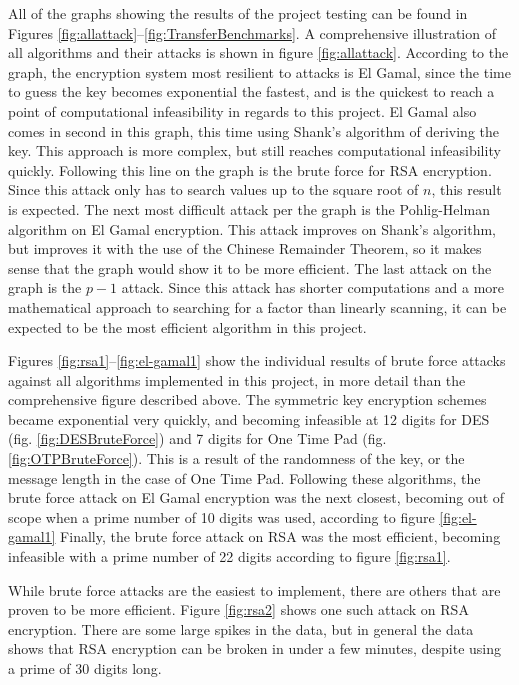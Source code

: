 \documentclass[12pt]{report}
\begin{document}
All of the graphs showing the results of the project testing can be found in Figures \ref{fig:allattack}--\ref{fig:TransferBenchmarks}. A comprehensive illustration of
all algorithms and their attacks is shown in figure \ref{fig:allattack}. According to the graph, the encryption system most resilient to attacks is El Gamal, since the
time to guess the key becomes exponential the fastest, and is the quickest to reach a point of computational infeasibility in regards to this project. El Gamal also
comes in second in this graph, this time using Shank's algorithm of deriving the key. This approach is more complex, but still reaches computational infeasibility
quickly. Following this line on the graph is the brute force for RSA encryption. Since this attack only has to search values up to the square root of $n$, this result
is expected. The next most difficult attack per the graph is the Pohlig-Helman algorithm on El Gamal encryption. This attack improves on Shank's algorithm, but improves
it with the use of the Chinese Remainder Theorem, so it makes sense that the graph would show it to be more efficient. The last attack on the graph is the $p-1$ attack.
Since this attack has shorter computations and a more mathematical approach to searching for a factor than linearly scanning, it can be expected to be the most efficient
algorithm in this project.

Figures \ref{fig:rsa1}--\ref{fig:el-gamal1} show the individual results of brute force attacks against all algorithms implemented in this project, in more detail than the
comprehensive figure described above. The symmetric key encryption schemes became exponential very quickly, and becoming infeasible at 12 digits for DES (fig.
\ref{fig:DESBruteForce}) and 7 digits for One Time Pad (fig. \ref{fig:OTPBruteForce}). This is a result of the randomness of the key, or the message length in the case of
One Time Pad. Following these algorithms, the brute force attack on El Gamal encryption was the next closest, becoming out of scope when a prime number of 10 digits was
used, according to figure \ref{fig:el-gamal1} Finally, the brute force attack on RSA was the most efficient, becoming infeasible with a prime number of 22 digits according
to figure \ref{fig:rsa1}.

While brute force attacks are the easiest to implement, there are others that are proven to be more efficient. Figure \ref{fig:rsa2} shows one such attack on RSA encryption.
There are some large spikes in the data, but in general the data shows that RSA encryption can be broken in under a few minutes, despite using a prime of 30 digits long.
\end{document}

